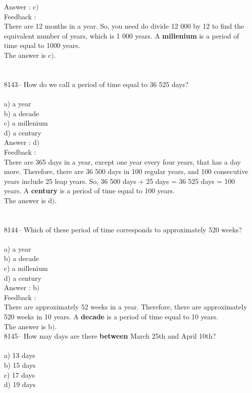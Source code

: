 \documentclass[letterpaper, 12pt]{article}
\begin{document}
Answer : c$)$\\

Feedback :\\
There are 12 months in a year. So, you need do divide 12 000 by 12 to find the equivalent number of years, which is 1 000 years. A \textbf{millenium} is a period of time equal to 1000 years. \\
The answer is c$)$.\\
\\
\\
8143-- How do we call a period of time equal to 36 525 days?\\
\\
a) a year\\
b) a decade\\
c) a millenium\\
d) a century\\

Answer : d$)$\\

Feedback :\\
There are 365 days in a year, except one year every four years, that has a day more. Therefore, there are 36 500 days in 100 regular years, and 100 consecutive years include 25 leap years. So, 36 500 days + 25 days = 36 525 days = 100 years. A \textbf{century} is a period of time equal to 100 years. \\
The answer is d$)$.\\
\\
\\
8144-- Which of these period of time corresponds to approximately 520 weeks?\\
\\
a) a year\\
b) a decade\\
c) a millenium\\
d) a century\\

Answer : b$)$\\

Feedback :\\
There are approximately 52 weeks in a year. Therefore, there are approximately 520 weeks in 10 years. A \textbf{decade} is a period of time equal to 10 years. \\
The answer is b$)$.\\

8145-- How may days are there \textbf{between} March 25th and April 10th?\\
\\
a) 13 days\\
b) 15 days\\
c) 17 days\\
d) 19 days\\
\end{document}
